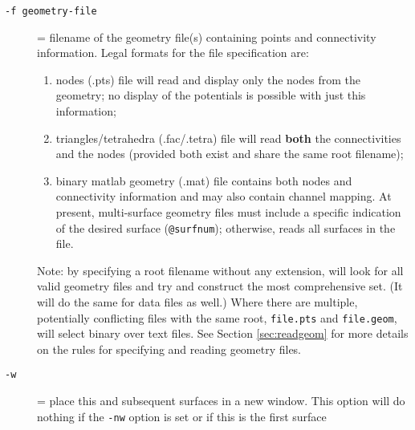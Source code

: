 \begin{description}
  \item[{\tt -f geometry-file} ]
    = filename of the geometry file(s) containing points and
    connectivity information.   Legal formats for the file specification 
    are: 
    \begin{enumerate}
      \item nodes (.pts) file will read and display only the 
        nodes from the geometry; no display of the potentials is 
        possible with just this information;
        
      \item triangles/tetrahedra (.fac/.tetra) file will read 
        \textbf{both} the connectivities and the nodes (provided
        both exist and share the same root filename);
        
      \item binary matlab geometry (.mat) file contains both nodes and 
        connectivity information and may also contain channel
        mapping.  At present, multi-surface geometry files must
	include a specific indication of the desired surface
	(\texttt{@surfnum}); otherwise, \map{} reads all surfaces
	in the file.
    \end{enumerate}
    Note: by specifying a root filename without any extension, \map{} will
    look for all valid geometry files and try and construct the most
    comprehensive set.  (It will do the same for data files as well.)
    Where there are multiple, potentially
    conflicting files with the same root, \eg{} \texttt{file.pts} and
    \texttt{file.geom}, \map{} will select binary over text files.  
    See Section \ref{sec:readgeom} for more details on the rules for
    specifying and reading geometry files.  
    
  \item[{\tt-w}] = place this and subsequent surfaces in a new window.
    This option will do nothing if the \texttt{-nw} option is set or if
    this is the first surface
    
    

\end{description}
